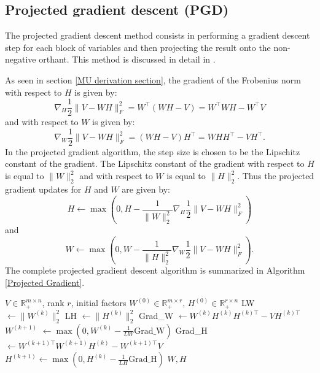 \subsection{Projected gradient descent (PGD)}
The projected gradient descent method consists in performing a gradient descent step for each block of variables and then projecting the result onto the non-negative orthant.
This method is discussed in detail in \cite{lin2007projected}.
\par
As seen in section \ref{MU derivation section}, the gradient of the Frobenius norm with respect to \( H \) is given by:
\begin{equation}
    \nabla_H \frac{1}{2} \|V - WH\|_F^2 = W^\top (WH - V) = W^\top WH - W^\top V
\end{equation}
and with respect to \( W \) is given by:
\begin{equation}
    \nabla_W \frac{1}{2} \|V - WH\|_F^2 = (WH - V) H^\top = W H H^\top - V H^\top.
\end{equation}
In the projected gradient algorithm, the step size is chosen to be the Lipschitz constant of the gradient.
The Lipschitz constant of the gradient with respect to \( H \)  is equal to \( \|W\|_2^2 \) and with respect to \( W \) is equal to \( \|H\|_2^2 \).
Thus the projected gradient updates for \( H \) and \( W \) are given by:
\begin{equation}
    H \leftarrow \max\left(0, H - \frac{1}{\|W\|_2^2} \nabla_H \frac{1}{2} \|V - WH\|_F^2 \right)
\end{equation}
and
\begin{equation}
    W \leftarrow \max\left(0, W - \frac{1}{\|H\|_2^2} \nabla_W \frac{1}{2   } \|V - WH\|_F^2 \right).
\end{equation}
The complete projected gradient descent algorithm is summarized in Algorithm \ref{Projected Gradient}.
\begin{algorithm}
    \caption{Projected Gradient Descent for NMF}
    \label{Projected Gradient}
    \begin{algorithmic}[1] 
        \Require \( V \in \mathbb{R}_+^{m \times n} \), rank \( r \), initial factors \( W^{(0)} \in \mathbb{R}_+^{m \times r} \), \( H^{(0)} \in \mathbb{R}_+^{r \times n} \)
            \State LW \( \leftarrow \|W^{(k)}\|_2^2 \)
            \State LH \( \leftarrow \|H^{(k)}\|_2^2 \)
            \State Grad\_W \( \leftarrow W^{(k)} H^{(k)} H^{(k) \top} - V H^{(k) \top} \)
            \State $W^{(k+1)}$ \( \leftarrow \max\left(0, W^{(k)} - \frac{1}{LW} \text{Grad\_W} \right) \)
            \State Grad\_H \( \leftarrow W^{(k+1) \top} W^{(k+1)} H^{(k)} - W^{(k+1) \top} V \)
            \State $H^{(k+1)} \leftarrow \max\left(0, H^{(k)} - \frac{1}{LH} \text{Grad\_H} \right)$
        \EndWhile
        \State \Return \( W, H \)
    \end{algorithmic}
\end{algorithm}
